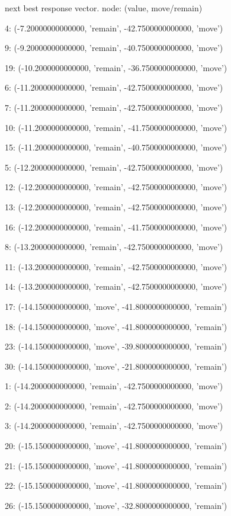  next best response vector.  node: (value, move/remain)


4: (-7.20000000000000, 'remain', -42.7500000000000, 'move')


9: (-9.20000000000000, 'remain', -40.7500000000000, 'move')


19: (-10.2000000000000, 'remain', -36.7500000000000, 'move')


6: (-11.2000000000000, 'remain', -42.7500000000000, 'move')


7: (-11.2000000000000, 'remain', -42.7500000000000, 'move')


10: (-11.2000000000000, 'remain', -41.7500000000000, 'move')


15: (-11.2000000000000, 'remain', -40.7500000000000, 'move')


5: (-12.2000000000000, 'remain', -42.7500000000000, 'move')


12: (-12.2000000000000, 'remain', -42.7500000000000, 'move')


13: (-12.2000000000000, 'remain', -42.7500000000000, 'move')


16: (-12.2000000000000, 'remain', -41.7500000000000, 'move')


8: (-13.2000000000000, 'remain', -42.7500000000000, 'move')


11: (-13.2000000000000, 'remain', -42.7500000000000, 'move')


14: (-13.2000000000000, 'remain', -42.7500000000000, 'move')


17: (-14.1500000000000, 'move', -41.8000000000000, 'remain')


18: (-14.1500000000000, 'move', -41.8000000000000, 'remain')


23: (-14.1500000000000, 'move', -39.8000000000000, 'remain')


30: (-14.1500000000000, 'move', -21.8000000000000, 'remain')


1: (-14.2000000000000, 'remain', -42.7500000000000, 'move')


2: (-14.2000000000000, 'remain', -42.7500000000000, 'move')


3: (-14.2000000000000, 'remain', -42.7500000000000, 'move')


20: (-15.1500000000000, 'move', -41.8000000000000, 'remain')


21: (-15.1500000000000, 'move', -41.8000000000000, 'remain')


22: (-15.1500000000000, 'move', -41.8000000000000, 'remain')


26: (-15.1500000000000, 'move', -32.8000000000000, 'remain')


